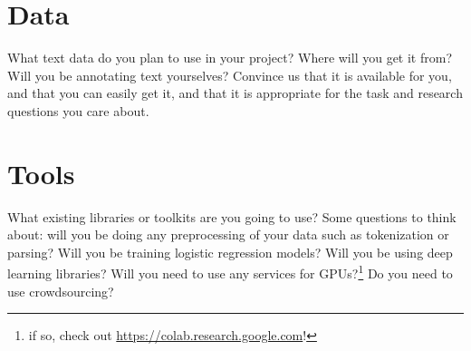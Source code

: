 \documentclass[11pt,a4paper]{article}
\begin{document}
\section{Data}
What text data do you plan to use in your project? Where will you get it from? Will you be annotating text yourselves? Convince us that it is available for you, and that you can easily get it, and that it is appropriate for the task and research questions you care about.

\section{Tools}
What existing libraries or toolkits are you going to use? Some questions to think about: will you be doing any preprocessing of your data such as tokenization or parsing? Will you be training logistic regression models? Will you be using deep learning libraries? Will you need to use any services for GPUs?\footnote{if so, check out \url{https://colab.research.google.com}!} Do you need to use crowdsourcing?


\footnotesize

\end{document}

